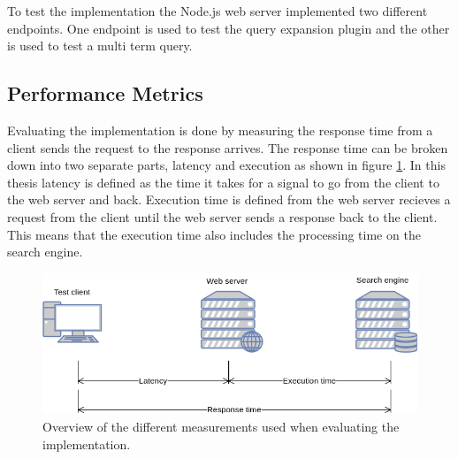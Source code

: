To test the implementation the Node.js web server implemented two different endpoints.
One endpoint is used to test the query expansion plugin and the other is used to test a multi term query.

\subsection{Performance Metrics}
Evaluating the implementation is done by measuring the response time from a client sends the request to the response arrives.
The response time can be broken down into two separate parts, latency and execution as shown in figure \ref{fig:latency-measurements}.
In this thesis latency is defined as the time it takes for a signal to go from the client to the web server and back.
Execution time is defined from the web server recieves a request from the client until the web server sends a response back to the client.
This means that the execution time also includes the processing time on the search engine.


\begin{figure}[h!]
  \centering \includegraphics[width=0.9\linewidth]{img/latency-measurements.png}
  \caption{Overview of the different measurements used when evaluating the implementation.}
  \label{fig:latency-measurements}
\end{figure}
